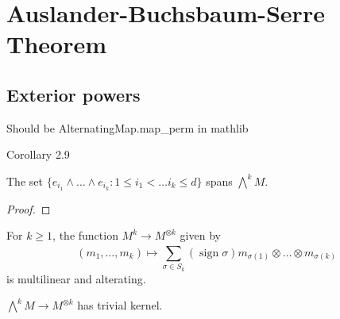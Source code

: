 \section{Auslander-Buchsbaum-Serre Theorem}








\subsection{Exterior powers}

\begin{theorem}
    \label{thm:exterior_power_univ_property}
\end{theorem}

\begin{lemma}
    \label{lem:alternating_multilinear_is_skew_symmetric}
    Should be AlternatingMap.map\_perm in mathlib
\end{lemma}

\begin{corollary}
    \label{cor:skew_symmetric_iff}
    Corollary 2.9
\end{corollary}

\begin{lemma}
    \label{lem:spans_exterior_power}
    The set $\{e_{i_1} \wedge \dots \wedge e_{i_k} : 1 \leq i_1 < \dots i_k \leq d\}$ spans $\bigwedge^k M$.
\end{lemma}

\begin{proof}
    
\end{proof}

\begin{lemma}
    \label{lem:multilinear_to_tensor_is_alternating}
    For $k \geq 1$, the function $M^k \to M^{\otimes k}$ given by 
    \[(m_1, \dots, m_k) \mapsto \sum_{\sigma \in S_k}^{} (\operatorname{sign} \sigma) m_{\sigma(1)} \otimes \dots \otimes m_{\sigma(k)} \]
    is multilinear and alterating.
\end{lemma}

\begin{lemma}
    \label{lem:hom_exterior_power_to_tensor_inj}
    $\bigwedge^k M \to M^{\otimes k}$ has trivial kernel.
\end{lemma}

